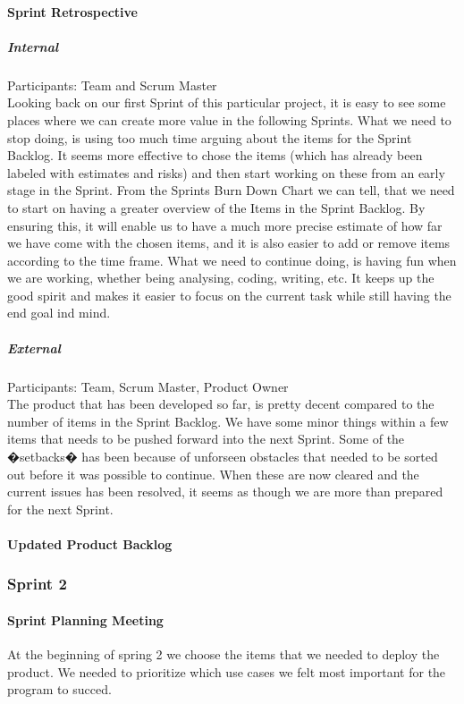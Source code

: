 \documentclass[a4paper,11pt,report]{report}
\begin{document}
			\paragraph{Sprint Retrospective}
				\subparagraph{Internal}
				Participants: Team and Scrum Master
				\\ 
				Looking back on our first Sprint of this particular project, it is easy to see some places where we can create more value in the following Sprints. What we need to stop doing, is using too much time arguing about the items for the Sprint Backlog. It seems more effective to chose the items (which has already been labeled with estimates and risks) and then start working on these from an early stage in the Sprint. From the Sprints Burn Down Chart we can tell, that we need to start on having a greater overview of the Items in the Sprint Backlog. By ensuring this, it will enable us to have a much more precise estimate of how far we have come with the chosen items, and it is also easier to add or remove items according to the time frame. What we need to continue doing, is having fun when we are working, whether being analysing, coding, writing, etc. It keeps up the good spirit and makes it easier to focus on the current task while still having the end goal ind mind.
				\subparagraph{External}
				Participants: Team, Scrum Master, Product Owner
				\\
The product that has been developed so far, is pretty decent compared to the number of items in the Sprint Backlog. We have some minor things within a few items that needs to be pushed forward into the next Sprint. Some of the �setbacks� has been because of unforseen obstacles that needed to be sorted out before it was possible to continue. When these are now cleared and the current issues has been resolved, it seems as though we are more than prepared for the next Sprint.
			\paragraph{Updated Product Backlog}
		\subsubsection{Sprint 2}
			\paragraph{Sprint Planning Meeting}
			At the beginning of spring 2 we choose the items that we needed to deploy the product. We needed to prioritize which use cases we felt most important for the program to succed.
\end{document}
